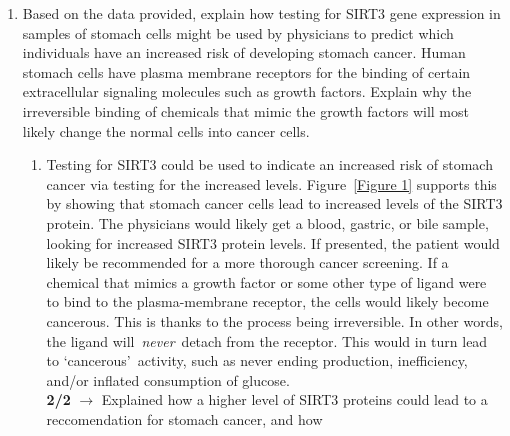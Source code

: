 \documentclass[11pt]{article}
\begin{document}
\begin{enumerate}
        \item Based on the data provided, explain how testing for SIRT3 gene expression in samples of
stomach cells might be used by physicians to predict which individuals have an increased risk of
developing stomach cancer. Human stomach cells have plasma membrane receptors for the
binding of certain extracellular signaling molecules such as growth factors. Explain why the
irreversible binding of chemicals that mimic the growth factors will most likely change the
normal cells into cancer cells.
        \begin{enumerate}
            \item Testing for SIRT3 could be used to indicate an increased risk of stomach cancer via testing for the increased levels.
            Figure~\ref{Figure 1} supports this by showing that stomach cancer cells lead to increased levels of the SIRT3 protein.
            The physicians would likely get a blood, gastric, or bile sample, looking for increased SIRT3 protein levels.
            If presented, the patient would likely be recommended for a more thorough cancer screening.
            If a chemical that mimics a growth factor or some other type of ligand were to bind to the plasma-membrane receptor, the cells would likely become cancerous.
            This is thanks to the process being irreversible.
            In other words, the ligand will~\textit{never}~detach from the receptor.
            This would in turn lead to \lq{cancerous}\rq\ activity, such as never ending production, inefficiency, and/or inflated consumption of glucose.\\
            \textbf{2/2} $\rightarrow$ Explained how a higher level of SIRT3 proteins could lead to a reccomendation for stomach cancer, and how
        \end{enumerate}
    \end{enumerate}
\end{document}
